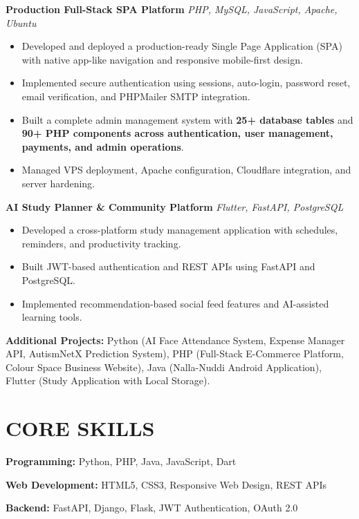 \documentclass[10pt,a4paper]{article}
\begin{document}
\textbf{Production Full-Stack SPA Platform}
\hfill \textit{PHP, MySQL, JavaScript, Apache, Ubuntu}

\begin{itemize}
\item Developed and deployed a production-ready Single Page Application (SPA) with native app-like navigation and responsive mobile-first design.
\item Implemented secure authentication using sessions, auto-login, password reset, email verification, and PHPMailer SMTP integration.
\item Built a complete admin management system with \textbf{25+ database tables} and \textbf{90+ PHP components across authentication, user management, payments, and admin operations}.
\item Managed VPS deployment, Apache configuration, Cloudflare integration, and server hardening.
\end{itemize}

\textbf{AI Study Planner \& Community Platform}
\hfill \textit{Flutter, FastAPI, PostgreSQL}

\begin{itemize}
\item Developed a cross-platform study management application with schedules, reminders, and productivity tracking.
\item Built JWT-based authentication and REST APIs using FastAPI and PostgreSQL.
\item Implemented recommendation-based social feed features and AI-assisted learning tools.
\end{itemize}

\textbf{Additional Projects:} Python (AI Face Attendance System, Expense Manager API, AutismNetX Prediction System), PHP (Full-Stack E-Commerce Platform, Colour Space Business Website), Java (Nalla-Nuddi Android Application), Flutter (Study Application with Local Storage).



\section*{CORE SKILLS}

\textbf{Programming:} Python, PHP, Java, JavaScript, Dart

\textbf{Web Development:} HTML5, CSS3, Responsive Web Design, REST APIs

\textbf{Backend:} FastAPI, Django, Flask, JWT Authentication, OAuth 2.0
\end{document}

